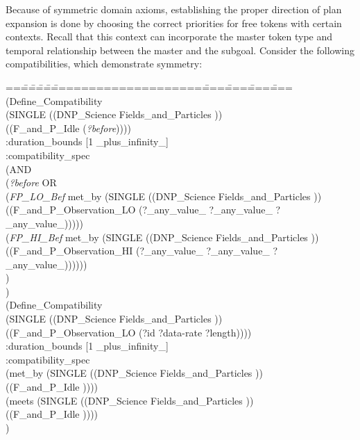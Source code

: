 
Because of symmetric domain axioms, establishing the proper direction 
of plan expansion is done by choosing the correct priorities for 
free tokens with certain contexts.
Recall that this context can incorporate the
master token type and temporal relationship between the master and the
subgoal.  Consider the following compatibilities, which demonstrate
symmetry:
\begin{tabbing}
==\==\==\==\==\=====================\====\====\====\====\kill
(Define\_Compatibility\\
\>  (SINGLE ((DNP\_Science Fields\_and\_Particles ))\\
\>\>\>      ((F\_and\_P\_Idle ({\em ?before}))))\\
\>    :duration\_bounds [1 \_plus\_infinity\_]\\
\>    :compatibility\_spec\\
\>  (AND\\
\>\>   ({\em ?before}  OR\\
\>\>\>   ({\em FP\_LO\_Bef} met\_by (SINGLE ((DNP\_Science Fields\_and\_Particles ))\\
\>\>\>\>\>        ((F\_and\_P\_Observation\_LO (?\_any\_value\_ ?\_any\_value\_ ?\_any\_value\_)))))\\
\>\>\>    ({\em FP\_HI\_Bef} met\_by (SINGLE ((DNP\_Science Fields\_and\_Particles ))\\
\>\>\>\>\>         ((F\_and\_P\_Observation\_HI (?\_any\_value\_ ?\_any\_value\_ ?\_any\_value\_))))))\\
\>   )\\
)\\


(Define\_Compatibility\\
\>  (SINGLE ((DNP\_Science Fields\_and\_Particles ))\\
\>\>\>     ((F\_and\_P\_Observation\_LO (?id ?data-rate ?length))))\\
\>    :duration\_bounds [1 \_plus\_infinity\_]\\
\>    :compatibility\_spec\\
\>    (met\_by (SINGLE ((DNP\_Science Fields\_and\_Particles ))\\
\>\>        ((F\_and\_P\_Idle ))))\\
\>    (meets (SINGLE ((DNP\_Science Fields\_and\_Particles ))\\
\>\>        ((F\_and\_P\_Idle ))))\\
)\\
\end{tabbing}

